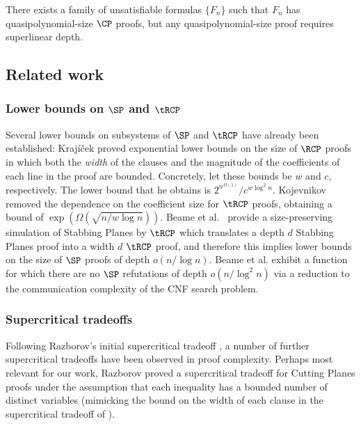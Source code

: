 \documentclass{toc}
\begin{document}
\begin{conjecture}\label{conj:deepProofs}
	There exists a family of unsatisfiable formulas $\{F_n\}$ such that $F_n$ has quasipolynomial-size $\CP$ proofs, but any quasipolynomial-size proof requires superlinear depth.
\end{conjecture}





\subsection{Related work}
%

\subsubsection{Lower bounds on $\SP$ and $\tRCP$} Several lower bounds on subsystems of $\SP$ and $\tRCP$ have already been established: %
Kraj\'{i}\v{c}ek \cite{Krajicek98} proved exponential lower bounds on the size of $\RCP$ proofs in which both the \emph{width} of the clauses and the magnitude of the coefficients of each line in the proof are bounded. Concretely, let these bounds be
$w$ and $c$, respectively. 
The lower bound that he obtains is $2^{n^{\Omega(1)}}/c^{w \log^2 n}$. Kojevnikov \cite{Kojevnikov07} removed the dependence on the coefficient size for $\tRCP$ proofs, obtaining a bound of $\exp(\Omega(\sqrt{n/w \log n}))$. Beame et al.~\cite{BeameFIKPPR18} provide a size-preserving simulation of Stabbing Planes by $\tRCP$ which translates a depth $d$ Stabbing Planes proof into a width $d$ $\tRCP$ proof, %
and therefore this implies lower bounds on the size of $\SP$ proofs of depth $o(n/\log n)$. Beame et al. \cite{BeameFIKPPR18} exhibit a function for which there are no $\SP$ refutations of depth $o(n / \log^2 n)$ via a reduction to the communication complexity of the CNF search problem. %

\subsubsection{Supercritical tradeoffs} %
%
%
%
Following Razborov's initial supercritical tradeoff \cite{Razborov16},  %
a number of
further  %
supercritical tradeoffs have been observed in proof complexity.  
Perhaps most relevant for our work, Razborov \cite{Razborov17} proved a supercritical tradeoff for Cutting Planes proofs under the assumption that each inequality has a bounded number of distinct variables (mimicking the bound on the width of each clause in the supercritical tradeoff of \cite{Razborov16}). 
\end{document}
